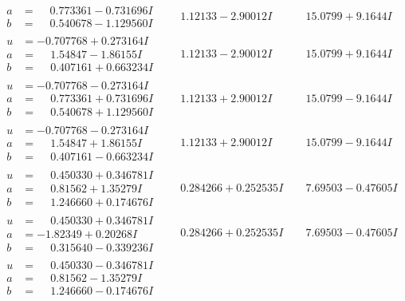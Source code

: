 \documentclass[1p]{elsarticle_modified}
\theoremstyle{definition}
\begin{document}
$$\begin{array}{c|c|c}
\begin{aligned}
a &= \phantom{-}0.773361 - 0.731696 I \\
b &= \phantom{-}0.540678 - 1.129560 I\end{aligned}
 & \phantom{-}1.12133 - 2.90012 I & \phantom{-}15.0799 + 9.1644 I \\ \hline\begin{aligned}
u &= -0.707768 + 0.273164 I \\
a &= \phantom{-}1.54847 - 1.86155 I \\
b &= \phantom{-}0.407161 + 0.663234 I\end{aligned}
 & \phantom{-}1.12133 - 2.90012 I & \phantom{-}15.0799 + 9.1644 I \\ \hline\begin{aligned}
u &= -0.707768 - 0.273164 I \\
a &= \phantom{-}0.773361 + 0.731696 I \\
b &= \phantom{-}0.540678 + 1.129560 I\end{aligned}
 & \phantom{-}1.12133 + 2.90012 I & \phantom{-}15.0799 - 9.1644 I \\ \hline\begin{aligned}
u &= -0.707768 - 0.273164 I \\
a &= \phantom{-}1.54847 + 1.86155 I \\
b &= \phantom{-}0.407161 - 0.663234 I\end{aligned}
 & \phantom{-}1.12133 + 2.90012 I & \phantom{-}15.0799 - 9.1644 I \\ \hline\begin{aligned}
u &= \phantom{-}0.450330 + 0.346781 I \\
a &= \phantom{-}0.81562 + 1.35279 I \\
b &= \phantom{-}1.246660 + 0.174676 I\end{aligned}
 & \phantom{-}0.284266 + 0.252535 I & \phantom{-}7.69503 - 0.47605 I \\ \hline\begin{aligned}
u &= \phantom{-}0.450330 + 0.346781 I \\
a &= -1.82349 + 0.20268 I \\
b &= \phantom{-}0.315640 - 0.339236 I\end{aligned}
 & \phantom{-}0.284266 + 0.252535 I & \phantom{-}7.69503 - 0.47605 I \\ \hline\begin{aligned}
u &= \phantom{-}0.450330 - 0.346781 I \\
a &= \phantom{-}0.81562 - 1.35279 I \\
b &= \phantom{-}1.246660 - 0.174676 I\end{aligned}

\end{array}$$
\end{document}
